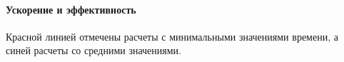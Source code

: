 \documentclass[12pt]{article}
\begin{document}
\paragraph{Ускорение и эффективность}
\begin{center}
\end{center}
Красной линией отмечены расчеты с минимальными значениями времени, а синей
расчеты со средними значениями.
\end{document}
